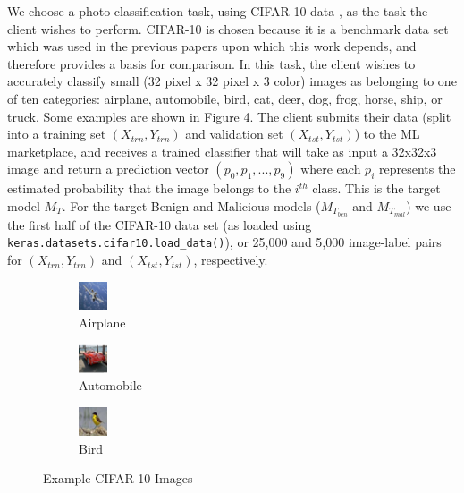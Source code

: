 We choose a photo classification task, using CIFAR-10 data \cite{Krizhevsky09learningmultiple}, as the task the client wishes to perform.  CIFAR-10 is chosen because it is a benchmark data set which was used in the previous papers upon which this work depends, \cite{DBLP:journals/corr/ShokriSS16,DBLP:journals/corr/abs-1709-07886} and therefore provides a basis for comparison.  In this task, the client wishes to accurately classify small (32 pixel x 32 pixel x 3 color) images as belonging to one of ten categories: airplane, automobile, bird, cat, deer, dog, frog, horse, ship, or truck.  Some examples are shown in Figure \ref{fig:examples}.  The client submits their data (split into a training set $(X_{trn}, Y_{trn})$ and validation set $(X_{tst},Y_{tst})$) to the ML marketplace, and receives a trained classifier that will take as input a 32x32x3 image and return a prediction vector $(p_0, p_1, ..., p_9)$ where each $p_i$ represents the estimated probability that the image belongs to the $i^{th}$ class.  This is the target model $M_T$.  For the target Benign and Malicious models ($M_{T_{ben}}$ and $M_{T_{mal}}$) we use the first half of the CIFAR-10 data set (as loaded using \texttt{keras.datasets.cifar10.load\_data()}), or 25,000 and 5,000 image-label pairs for $(X_{trn}, Y_{trn})$ and $(X_{tst}, Y_{tst})$, respectively.

\begin{figure}
    \centering
    \begin{subfigure}{.32\linewidth}
        \centering
        \includegraphics{graphics/airplane2.png}
        \caption{Airplane}
        \label{subfig:airplane2}
    \end{subfigure}
    \begin{subfigure}{.32\linewidth}
        \centering
        \includegraphics{graphics/automobile6.png}
        \caption{Automobile}
        \label{subfig:automobile6}
    \end{subfigure}
    \begin{subfigure}{.32\linewidth}
        \centering
        \includegraphics{graphics/bird9.png}
        \caption{Bird}
        \label{subfig:bird9}
    \end{subfigure}
    \caption{Example CIFAR-10 Images}
    \label{fig:examples}
\end{figure}

